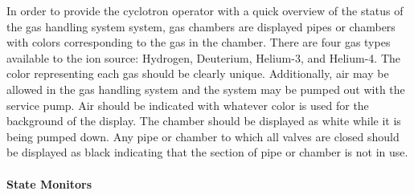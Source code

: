 \documentclass[11pt]{book}		%
\begin{document}
In order to provide the cyclotron operator with a quick overview of the status of the gas handling system system, gas chambers are displayed pipes or chambers with colors corresponding to the gas in the chamber.  There are four gas types available to the ion source: Hydrogen, Deuterium, Helium-3, and Helium-4.  The color representing each gas should be clearly unique.  Additionally, air may be allowed in the gas handling system and the system may be pumped out with the service pump.  Air should be indicated with whatever color is used for the background of the display.  The chamber should be displayed as white while it is being pumped down.  Any pipe or chamber to which all valves are closed should be displayed as black indicating that the section of pipe or chamber is not in use. 



\paragraph{State Monitors}
\end{document}
